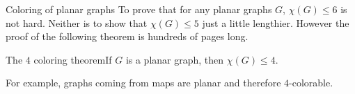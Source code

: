 \documentclass{beamer}
\def\bl[#1]#2{\begin{block}{#1}#2\end{block}}
\begin{document}
\begin{frame}{Coloring of planar graphs}
To prove that for any planar graphs $G$, $\chi(G)\leq 6$ is not hard. Neither is to show that $\chi(G)\leq 5$ just a little lengthier. However the proof of the following theorem is hundreds of pages long.\vspace{0.5cm}

\bl[The $4$ coloring theorem]{If $G$ is a planar graph, then $\chi(G)\leq 4$.}\vspace{0.5cm}

For example, graphs coming from maps are planar and therefore $4$-colorable.
\end{frame}
\end{document}
